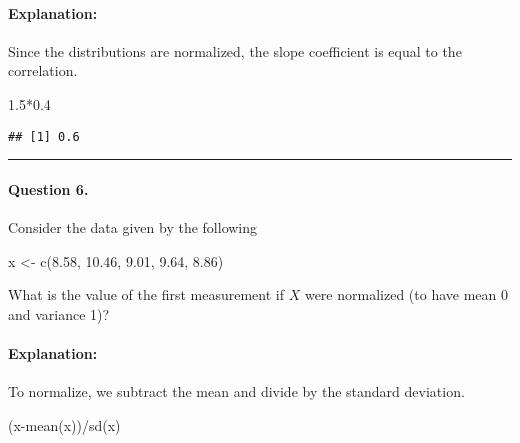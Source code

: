\documentclass[
]{article}
\newenvironment{Shaded}{\begin{snugshade}}{\end{snugshade}}
\newcommand{\FloatTok}[1]{\textcolor[rgb]{0.00,0.00,0.81}{#1}}
\newcommand{\FunctionTok}[1]{\textcolor[rgb]{0.00,0.00,0.00}{#1}}
\newcommand{\NormalTok}[1]{#1}
\newcommand{\OtherTok}[1]{\textcolor[rgb]{0.56,0.35,0.01}{#1}}
\newcommand{\SpecialCharTok}[1]{\textcolor[rgb]{0.00,0.00,0.00}{#1}}
\begin{document}
\hypertarget{explanation-4}{%
\paragraph{Explanation:}\label{explanation-4}}

Since the distributions are normalized, the slope coefficient is equal
to the correlation.

\begin{Shaded}
\begin{Highlighting}[]
\FloatTok{1.5}\SpecialCharTok{*}\FloatTok{0.4}
\end{Highlighting}
\end{Shaded}

\begin{verbatim}
## [1] 0.6
\end{verbatim}

\begin{center}\rule{0.5\linewidth}{0.5pt}\end{center}

\hypertarget{question-6.}{%
\paragraph{Question 6.}\label{question-6.}}

Consider the data given by the following

\begin{Shaded}
\begin{Highlighting}[]
\NormalTok{x }\OtherTok{\textless{}{-}} \FunctionTok{c}\NormalTok{(}\FloatTok{8.58}\NormalTok{, }\FloatTok{10.46}\NormalTok{, }\FloatTok{9.01}\NormalTok{, }\FloatTok{9.64}\NormalTok{, }\FloatTok{8.86}\NormalTok{)}
\end{Highlighting}
\end{Shaded}

What is the value of the first measurement if \(X\) were normalized (to
have mean 0 and variance 1)?

\hypertarget{explanation-5}{%
\paragraph{Explanation:}\label{explanation-5}}

To normalize, we subtract the mean and divide by the standard deviation.

\begin{Shaded}
\begin{Highlighting}[]
\NormalTok{(x}\SpecialCharTok{{-}}\FunctionTok{mean}\NormalTok{(x))}\SpecialCharTok{/}\FunctionTok{sd}\NormalTok{(x)}
\end{Highlighting}
\end{Shaded}
\end{document}
